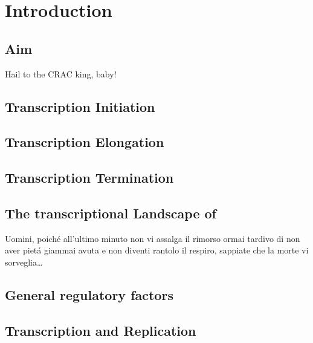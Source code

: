 \documentclass{Thesis}
\begin{document}
\frontmatter

\part{Introduction}
\chapter{Aim}
	
\begin{savequote}[70mm]
Hail to the CRAC king, baby!
\end{savequote}

\chapter{Transcription Initiation}
	
\chapter{Transcription Elongation}
	
\chapter{Transcription Termination} \label{termination}
	
\chapter{The transcriptional Landscape of \cer{}}
	
	
\begin{savequote}[70mm]
Uomini, poich\'{e} all'ultimo minuto non vi assalga il rimorso ormai tardivo di non aver piet\'{a} giammai avuta e non diventi rantolo il respiro, sappiate che la morte vi sorveglia\ldots
{} 
\end{savequote}
\chapter{General regulatory factors}
	

\chapter{Transcription and Replication}
	
\end{document}
